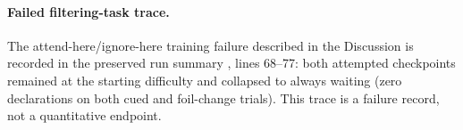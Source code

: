 \paragraph{Failed filtering-task trace.} The attend-here/ignore-here training failure
described in the Discussion is recorded in the preserved run summary
, lines 68--77: both attempted checkpoints remained at the
starting difficulty and collapsed to always waiting (zero declarations on both cued
and foil-change trials). This trace is a failure record, not a quantitative endpoint.
